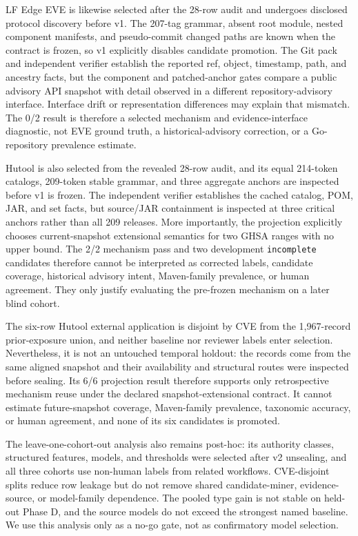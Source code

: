 LF Edge EVE is likewise selected after the 28-row audit and undergoes disclosed protocol discovery before v1. The 207-tag grammar, absent root module, nested component manifests, and pseudo-commit changed paths are known when the contract is frozen, so v1 explicitly disables candidate promotion. The Git pack and independent verifier establish the reported ref, object, timestamp, path, and ancestry facts, but the component and patched-anchor gates compare a public advisory API snapshot with detail observed in a different repository-advisory interface. Interface drift or representation differences may explain that mismatch. The 0/2 result is therefore a selected mechanism and evidence-interface diagnostic, not EVE ground truth, a historical-advisory correction, or a Go-repository prevalence estimate.

Hutool is also selected from the revealed 28-row audit, and its equal 214-token catalogs, 209-token stable grammar, and three aggregate anchors are inspected before v1 is frozen. The independent verifier establishes the cached catalog, POM, JAR, and set facts, but source/JAR containment is inspected at three critical anchors rather than all 209 releases. More importantly, the projection explicitly chooses current-snapshot extensional semantics for two GHSA ranges with no upper bound. The 2/2 mechanism pass and two development \texttt{incomplete} candidates therefore cannot be interpreted as corrected labels, candidate coverage, historical advisory intent, Maven-family prevalence, or human agreement. They only justify evaluating the pre-frozen mechanism on a later blind cohort.

The six-row Hutool external application is disjoint by CVE from the 1,967-record prior-exposure union, and neither baseline nor reviewer labels enter selection. Nevertheless, it is not an untouched temporal holdout: the records come from the same aligned snapshot and their availability and structural routes were inspected before sealing. Its 6/6 projection result therefore supports only retrospective mechanism reuse under the declared snapshot-extensional contract. It cannot estimate future-snapshot coverage, Maven-family prevalence, taxonomic accuracy, or human agreement, and none of its six candidates is promoted.

The leave-one-cohort-out analysis also remains post-hoc: its authority classes, structured features, models, and thresholds were selected after v2 unsealing, and all three cohorts use non-human labels from related workflows. CVE-disjoint splits reduce row leakage but do not remove shared candidate-miner, evidence-source, or model-family dependence. The pooled type gain is not stable on held-out Phase D, and the source models do not exceed the strongest named baseline. We use this analysis only as a no-go gate, not as confirmatory model selection.

